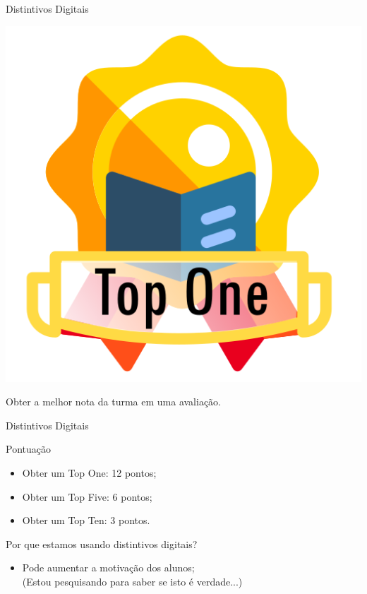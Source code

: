 \documentclass[xcolor=dvipsnames,table]{beamer}
\begin{document}
	\begin{frame}{Distintivos Digitais}
		\begin{block}{}
			\begin{center}
				\includegraphics[height=.65\textheight]{images/badges/top-one.png}
			\end{center}		
			Obter a melhor nota da turma em uma avaliação. 
		\end{block}
	\end{frame}
	
	\begin{frame}{Distintivos Digitais}
		\begin{block}{Pontuação}
			\begin{itemize}
				\item Obter um {\sc Top One}: 12 pontos;
				\item Obter um {\sc Top Five}: 6 pontos;
				\item Obter um {\sc Top Ten}: 3 pontos.
			\end{itemize}
		\end{block} \pause
		\begin{block}{Por que estamos usando distintivos digitais?}
			\begin{itemize}
				\item Pode aumentar a motivação dos alunos; \\ \pause
				{\color{blue} (Estou pesquisando para saber se isto é verdade...)}
			\end{itemize}
		\end{block}
	\end{frame}
\end{document}
